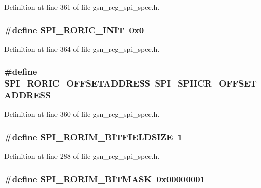 Definition at line 361 of file gsn\_\-reg\_\-spi\_\-spec.h.

\hypertarget{a00573_ad656b71a7db69dcc6152f336c3cd1a59}{
\subsubsection[{SPI\_\-RORIC\_\-INIT}]{\setlength{\rightskip}{0pt plus 5cm}\#define SPI\_\-RORIC\_\-INIT~0x0}}
\label{a00573_ad656b71a7db69dcc6152f336c3cd1a59}


Definition at line 364 of file gsn\_\-reg\_\-spi\_\-spec.h.

\hypertarget{a00573_acc51cbfcdd596dfb0377ee9a57b8ba54}{
\subsubsection[{SPI\_\-RORIC\_\-OFFSETADDRESS}]{\setlength{\rightskip}{0pt plus 5cm}\#define SPI\_\-RORIC\_\-OFFSETADDRESS~SPI\_\-SPIICR\_\-OFFSETADDRESS}}
\label{a00573_acc51cbfcdd596dfb0377ee9a57b8ba54}


Definition at line 360 of file gsn\_\-reg\_\-spi\_\-spec.h.

\hypertarget{a00573_aa7026cd01d9579f79ab7987fa61c3e46}{
\subsubsection[{SPI\_\-RORIM\_\-BITFIELDSIZE}]{\setlength{\rightskip}{0pt plus 5cm}\#define SPI\_\-RORIM\_\-BITFIELDSIZE~1}}
\label{a00573_aa7026cd01d9579f79ab7987fa61c3e46}


Definition at line 288 of file gsn\_\-reg\_\-spi\_\-spec.h.

\hypertarget{a00573_ae4cab1a633155b6b56dd67e53bb9d17d}{
\subsubsection[{SPI\_\-RORIM\_\-BITMASK}]{\setlength{\rightskip}{0pt plus 5cm}\#define SPI\_\-RORIM\_\-BITMASK~0x00000001}}
\label{a00573_ae4cab1a633155b6b56dd67e53bb9d17d}


